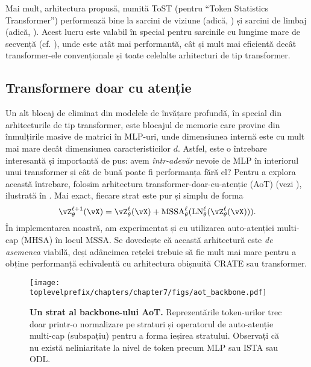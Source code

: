 \documentclass[../../book-main_ro.tex]{subfiles}
\begin{document}
Mai mult, arhitectura propusă, numită ToST (pentru ``Token Statistics Transformer'') performează bine la sarcini de viziune (adică, ) și sarcini de limbaj (adică, ). Acest lucru este valabil în special pentru sarcinile cu lungime mare de secvență (cf. ), unde este atât mai performantă, cât și mult mai eficientă decât transformer-ele convenționale și toate celelalte arhitecturi de tip transformer.

\subsection{Transformere doar cu atenție} \label{sub:aot_experiments}

Un alt blocaj de eliminat din modelele de învățare profundă, în special din arhitecturile de tip transformer, este blocajul de memorie care provine din înmulțirile masive de matrici în MLP-uri, unde dimensiunea internă este cu mult mai mare decât dimensiunea caracteristicilor \(d\). Astfel, este o întrebare interesantă și importantă de pus: avem \textit{într-adevăr} nevoie de MLP în interiorul unui transformer și cât de bună poate fi performanța fără el? Pentru a explora această întrebare, folosim arhitectura transformer-doar-cu-atenție (AoT) (vezi ), ilustrată în . Mai exact, fiecare strat este pur și simplu de forma 
\begin{equation}
    \vZ_{\theta}^{\ell + 1}(\vX) = \vZ_{\theta}^{\ell}(\vX) + \MSSA_{\theta}^{\ell}(\LN_{\theta}^{\ell}(\vZ_{\theta}^{\ell}(\vX))).
\end{equation}
În implementarea noastră, am experimentat și cu utilizarea auto-atenției multi-cap (MHSA) în locul MSSA. Se dovedește că această arhitectură este \textit{de asemenea} viabilă, deși adâncimea rețelei trebuie să fie mult mai mare pentru a obține performanță echivalentă cu arhitectura obișnuită CRATE sau transformer. %

\begin{figure}[!htbp]
    \centering 
    \texttt{[image: \\toplevelprefix/chapters/chapter7/figs/aot\_backbone.pdf]}
    \caption{\small\textbf{Un strat al backbone-ului AoT.} Reprezentările token-urilor trec doar printr-o normalizare pe straturi și operatorul de auto-atenție multi-cap (subspațiu) pentru a forma ieșirea stratului. Observați că nu există neliniaritate la nivel de token precum MLP sau ISTA sau ODL.}
    \label{fig:aot_backbone}
\end{figure}
\end{document}
